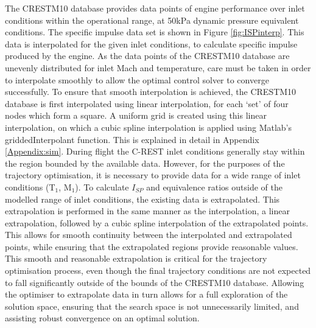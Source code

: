 The \textsf{CRESTM10} database provides data points of engine performance over inlet conditions within the operational range, at 50kPa dynamic pressure equivalent conditions. The specific impulse data set is shown in Figure \ref{fig:ISPinterp}. This data is interpolated for the given inlet conditions, to calculate specific impulse produced by the engine. As the data points of the \textsf{CRESTM10} database are unevenly distributed for inlet Mach and temperature, care must be taken in order to interpolate smoothly to allow the optimal control solver to converge successfully. To ensure that smooth interpolation is achieved, the \textsf{CRESTM10} database is first interpolated using linear interpolation, for each `set' of four nodes which form a square. A uniform grid is created using this linear interpolation, on which a cubic spline interpolation is applied using Matlab's \textsf{griddedInterpolant} function. This is explained in detail in Appendix \ref{Appendix:sim}. During flight the C-REST inlet conditions generally stay within the region bounded by the available data. However, for the purposes of the trajectory optimisation, it is necessary to provide data for a wide range of inlet conditions (T$_1$, M$_1$). To calculate $I_{SP}$ and equivalence ratios outside of the modelled range of inlet conditions, the existing data is extrapolated. This extrapolation is performed in the same manner as the interpolation, a linear extrapolation, followed by a cubic spline interpolation of the extrapolated points. This allows for smooth continuity between the interpolated and extrapolated points, while ensuring that the extrapolated regions provide reasonable values. This smooth and reasonable extrapolation is critical for the trajectory optimisation process, even though the final trajectory conditions are not expected to fall significantly outside of the bounds of the \textsf{CRESTM10} database. Allowing the optimiser to extrapolate data in turn allows for a full exploration of the solution space, ensuring that the search space is not unnecessarily limited, and assisting robust convergence on an optimal solution. 

